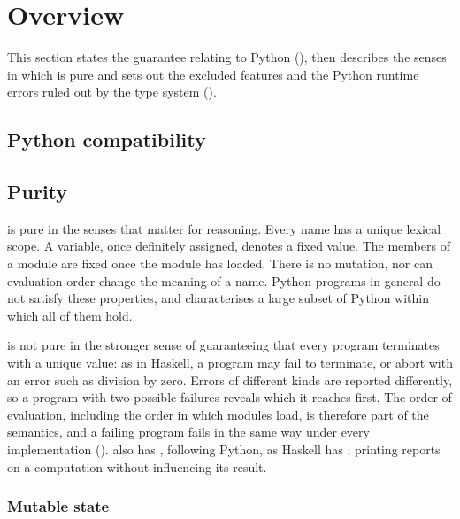 \section{Overview}
\label{sec:overview}

This section states the guarantee relating \PurePy to Python (), then describes
the senses in which \PurePy is pure and sets out the excluded features and the Python runtime errors ruled out by the type
system ().

\subsection{Python compatibility}
\label{sec:python-compatibility}







\subsection{Purity}
\label{sec:purity}

\PurePy is pure in the senses that matter for reasoning. Every name has a unique lexical scope. A variable,
once definitely assigned, denotes a fixed value. The members of a module are fixed once the module has loaded.
There is no mutation, nor can evaluation order change the meaning of a name. Python programs in general do not
satisfy these properties, and \PurePy characterises a large subset of Python within which all of them hold.

\PurePy is not pure in the stronger sense of guaranteeing that every program terminates with a unique value: as in
Haskell, a program may fail to terminate, or abort with an error such as division by zero. Errors of different kinds
are reported differently, so a program with two possible failures reveals which it reaches first. The order of
evaluation, including the order in which modules load, is therefore part of the semantics, and a failing program fails
in the same way under every implementation (). \PurePy also has ,
following Python, as Haskell has ; printing reports on a computation without influencing its result.

\subsubsection{Mutable state}
\label{sec:no-mutable-state}
\label{sec:local-assignment}

